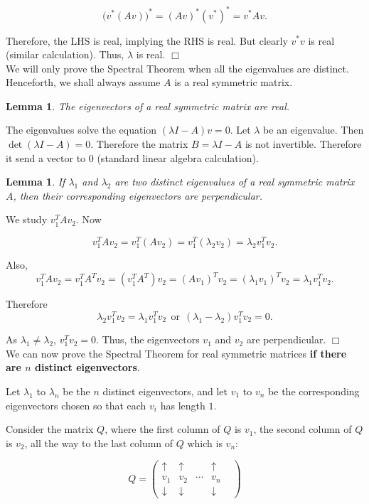 \documentclass[12pt,letterpaper]{report}
\newcommand\be{\begin{equation}}
\newcommand\ee{\end{equation}}
\newcommand{\tbf}[1]{\textbf{#1}}
\newtheorem{lem}[thm]{Lemma}
\begin{document}
\be \Big(v^{*} (Av)\Big)^{*} = (Av)^{*} (v^{*})^{*} = v^{*} A v.
\ee

Therefore, the LHS is real, implying the RHS is real. But clearly
$v^{*} v$ is real (similar calculation). Thus, $\lambda$ is real.
$\Box$ \\

We will only prove the Spectral Theorem when all the eigenvalues
are distinct. Henceforth, we shall always assume $A$ is a real
symmetric matrix.

\begin{lem} The eigenvectors of a real symmetric matrix are real.
\end{lem}

The eigenvalues solve the equation $(\lambda I - A)v = 0$. Let
$\lambda$ be an eigenvalue. Then $\det(\lambda I - A) = 0$.
Therefore the matrix $B = \lambda I - A$ is not invertible.
Therefore it send a vector to $0$ (standard linear algebra
calculation).

\begin{lem} If $\lambda_1$ and $\lambda_2$ are two distinct
eigenvalues of a real symmetric matrix $A$, then their
corresponding eigenvectors are perpendicular. \end{lem}

We study $v_1^T A v_2$. Now

\be v_1^T A v_2 = v_1^T (Av_2) = v_1^T (\lambda_2 v_2) = \lambda_2
v_1^T v_2. \ee

Also, \be v_1^T A v_2 = v_1^T A^T v_2 = (v_1^T A^T) v_2 = (Av_1)^T
v_2 = (\lambda_1 v_1)^T v_2 = \lambda_1 v_1^T v_2. \ee

Therefore \be \lambda_2 v_1^T v_2 = \lambda_1 v_1^T v_2 \ \
\mbox{or} \ \ (\lambda_1 - \lambda_2) v_1^T v_2 = 0. \ee

As $\lambda_1 \neq \lambda_2$, $v_1^T v_2 = 0$. Thus, the
eigenvectors $v_1$ and $v_2$ are perpendicular. $\Box$ \\

We can now prove the Spectral Theorem for real symmetric matrices
\tbf{if there are $n$ distinct eigenvectors}.

Let $\lambda_1$ to $\lambda_n$ be the $n$ distinct eigenvectors,
and let $v_1$ to $v_n$ be the corresponding eigenvectors chosen so
that each $v_i$ has length $1$.

Consider the matrix $Q$, where the first column of $Q$ is $v_1$,
the second column of $Q$ is $v_2$, all the way to the last column
of $Q$ which is $v_n$:

\be Q = \left(\begin{array}{ccccc}
                        \uparrow  &  \uparrow & \ &  \uparrow &  \\
                        v_1 & v_2  &  \cdots &  v_n &  \\
                        \downarrow  & \downarrow  &  \  &  \downarrow &
                          \end{array}\right)
\ee
\end{document}
